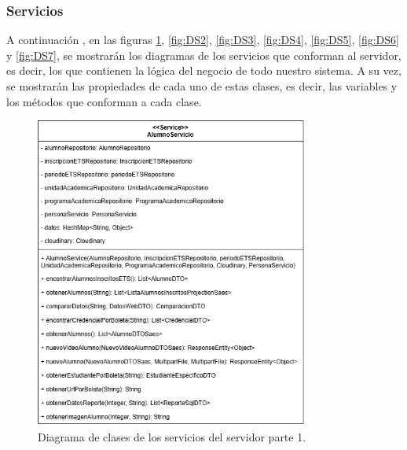 \newpage
\subsubsection{Servicios}
A continuación , en las figuras \ref{fig:DS1}, \ref{fig:DS2}, \ref{fig:DS3}, \ref{fig:DS4}, \ref{fig:DS5}, \ref{fig:DS6} y \ref{fig:DS7}, se mostrarán los diagramas de los servicios que conforman al servidor, es decir, los que contienen la lógica del negocio de todo nuestro sistema. A su vez, se mostrarán las propiedades de cada uno de estas clases, es decir, las variables y los métodos que conforman a cada clase.

\begin{figure}[htbp!]
	\begin{center}
		\includegraphics[width=0.8\textwidth]{Clases/Servicio1.png}
		\caption{Diagrama de clases de los servicios del servidor parte 1.}
		\label{fig:DS1}
	\end{center}
\end{figure}


